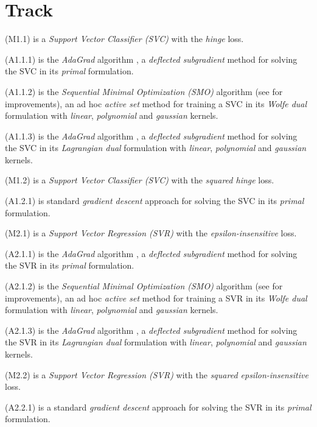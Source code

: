\section{Track}

(M1.1) is a \emph{Support Vector Classifier (SVC)} with the \emph{hinge} loss.

(A1.1.1) is the \emph{AdaGrad} algorithm \cite{duchi2011adaptive}, a \emph{deflected subgradient} method for solving the SVC in its \emph{primal} formulation.

(A1.1.2) is the \emph{Sequential Minimal Optimization (SMO)} algorithm \cite{platt1998sequential} (see \cite{keerthi2001improvements} for improvements), an ad hoc \emph{active set} method for training a SVC in its \emph{Wolfe dual} formulation with \emph{linear}, \emph{polynomial} and \emph{gaussian} kernels.

(A1.1.3) is the \emph{AdaGrad} algorithm \cite{duchi2011adaptive}, a \emph{deflected subgradient} method for solving the SVC in its \emph{Lagrangian dual} formulation with \emph{linear}, \emph{polynomial} and \emph{gaussian} kernels.

(M1.2) is a \emph{Support Vector Classifier (SVC)} with the \emph{squared hinge} loss.

(A1.2.1) is standard \emph{gradient descent} approach for solving the SVC in its \emph{primal} formulation.

(M2.1) is a \emph{Support Vector Regression (SVR)} with the \emph{epsilon-insensitive} loss.

(A2.1.1) is the \emph{AdaGrad} algorithm \cite{duchi2011adaptive}, a \emph{deflected subgradient} method for solving the SVR in its \emph{primal} formulation.

(A2.1.2) is the \emph{Sequential Minimal Optimization (SMO)} algorithm \cite{flake2002efficient} (see \cite{shevade1999improvements} for improvements), an ad hoc \emph{active set} method for training a SVR in its \emph{Wolfe dual} formulation with \emph{linear}, \emph{polynomial} and \emph{gaussian} kernels.

(A2.1.3) is the \emph{AdaGrad} algorithm \cite{duchi2011adaptive}, a \emph{deflected subgradient} method for solving the SVR in its \emph{Lagrangian dual} formulation with \emph{linear}, \emph{polynomial} and \emph{gaussian} kernels.

(M2.2) is a \emph{Support Vector Regression (SVR)} with the \emph{squared epsilon-insensitive} loss.

(A2.2.1) is a standard \emph{gradient descent} approach for solving the SVR in its \emph{primal} formulation.